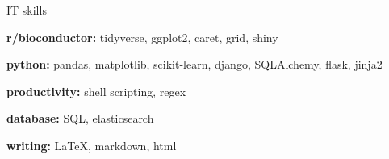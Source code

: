 

\begin{cvskills}
  \cvskill
    {IT skills} %
    {
      \begin{cvitems}
        \item {\textbf{r/bioconductor:} tidyverse, ggplot2, caret, grid, shiny}
        \item {\textbf{python:} pandas, matplotlib, scikit-learn, django, SQLAlchemy, flask, jinja2}
        \item {\textbf{productivity:} shell scripting, regex}
        \item {\textbf{database:} SQL, elasticsearch}
        \item {\textbf{writing:} LaTeX, markdown, html}
      \end{cvitems}
      }
      

\end{cvskills}
